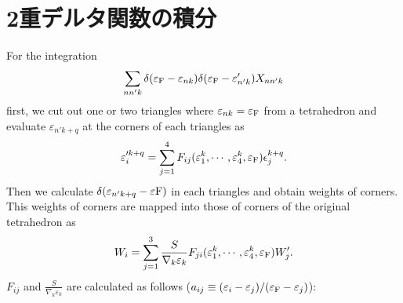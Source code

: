 \documentclass[letterpaper,10pt,dvipdfmx,openany]{sphinxmanual}
\begin{document}
\section{2重デルタ関数の積分}
\label{\detokenize{app:id3}}
\sphinxAtStartPar
For the integration
\begin{equation*}
\begin{split}\begin{align}
\sum_{n n' k} \delta(\varepsilon_{\rm F} -
\varepsilon_{n k}) \delta(\varepsilon_{\rm F} - \varepsilon'_{n' k})
X_{n n' k}
\end{align}\end{split}
\end{equation*}
\sphinxAtStartPar
first, we cut out one or two triangles where
\(\varepsilon_{n k} = \varepsilon_{\rm F}\) from a tetrahedron
and evaluate \(\varepsilon_{n' k+q}\) at the corners of each triangles as
\begin{equation*}
\begin{split}\begin{align}
\varepsilon'^{k+q}_{i} = \sum_{j=1}^4 F_{i j}(
\varepsilon_1^{k}, \cdots, \varepsilon_{4}^{k}, \varepsilon_{\rm F})
\epsilon_{j}^{k+q}.
\end{align}\end{split}
\end{equation*}
\sphinxAtStartPar
Then we calculate \(\delta(\varepsilon_{n' k+q} - \varepsilon{\rm F})\)
in each triangles and obtain weights of corners.
This weights of corners are mapped into those of corners of the original tetrahedron as
\begin{equation*}
\begin{split}\begin{align}
W_{i} = \sum_{j=1}^3 \frac{S}{\nabla_k \varepsilon_k}F_{j i}(
\varepsilon_{1}^k, \cdots, \varepsilon_{4}^k, \varepsilon_{\rm F})
W'_{j}.
\end{align}\end{split}
\end{equation*}
\sphinxAtStartPar
\(F_{i j}\) and \(\frac{S}{\nabla_k \varepsilon_k}\) are calculated as follows
(\(a_{i j} \equiv (\varepsilon_i - \varepsilon_j)/(\varepsilon_{\rm F} - \varepsilon_j)\)):
\end{document}
